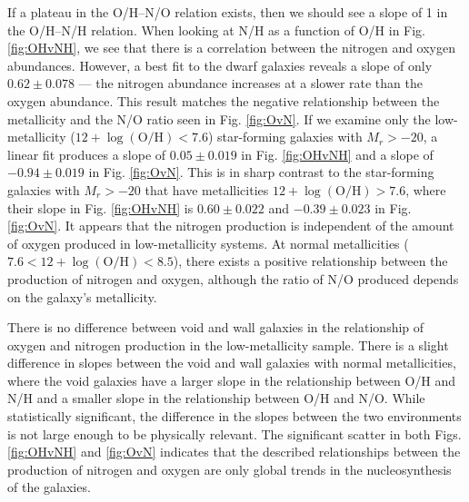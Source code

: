 If a plateau in the O/H--N/O relation exists, then we should see a slope of 1 in 
the O/H--N/H relation.  When looking at N/H as a function of O/H in Fig. 
\ref{fig:OHvNH}, we see that there is a correlation between the nitrogen and 
oxygen abundances.  However, a best fit to the dwarf galaxies reveals a slope of 
only $0.62\pm 0.078$ --- the nitrogen abundance increases at a slower rate than 
the oxygen abundance.  This result matches the negative relationship between the 
metallicity and the N/O ratio seen in Fig. \ref{fig:OvN}.  If we examine only 
the low-metallicity ($12 + \log(\text{O}/\text{H}) < 7.6$) star-forming galaxies 
with $M_r > -20$, a linear fit produces a slope of $0.05\pm 0.019$ in Fig. 
\ref{fig:OHvNH} and a slope of $-0.94\pm 0.019$ in Fig. \ref{fig:OvN}.  This is 
in sharp contrast to the star-forming galaxies with $M_r > -20$ that have 
metallicities $12 + \log(\text{O}/\text{H}) > 7.6$, where their slope in Fig. 
\ref{fig:OHvNH} is $0.60\pm 0.022$ and $-0.39\pm 0.023$ in Fig. \ref{fig:OvN}.  
It appears that the nitrogen production is independent of the amount of oxygen 
produced in low-metallicity systems.  At normal metallicities 
($7.6 < 12 + \log(\text{O}/\text{H}) < 8.5$), there exists a positive 
relationship between the production of nitrogen and oxygen, although the ratio 
of N/O produced depends on the galaxy's metallicity.

There is no difference between void and wall galaxies in the relationship of 
oxygen and nitrogen production in the low-metallicity sample.  There is a slight 
difference in slopes between the void and wall galaxies with normal 
metallicities, where the void galaxies have a larger slope in the relationship 
between O/H and N/H and a smaller slope in the relationship between O/H and N/O.  
While statistically significant, the difference in the slopes between the two 
environments is not large enough to be physically relevant.  The significant 
scatter in both Figs. \ref{fig:OHvNH} and \ref{fig:OvN} indicates that the 
described relationships between the production of nitrogen and oxygen are only 
global trends in the nucleosynthesis of the galaxies.

